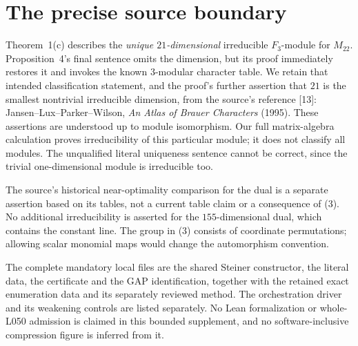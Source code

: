 \documentclass[11pt,a4paper]{article}
\begin{document}
\section{The precise source boundary}
Theorem~1(c) describes the \emph{unique $21$-dimensional} irreducible
$F_3$-module for $M_{22}$. Proposition~4's final sentence omits the dimension,
but its proof immediately restores it and invokes the known $3$-modular
character table. We retain that intended classification statement, and
the proof's further assertion that $21$ is the smallest nontrivial
irreducible dimension, from the source's reference [13]:
Jansen--Lux--Parker--Wilson, \emph{An Atlas of Brauer Characters} (1995).
These assertions are understood up to module isomorphism. Our full
matrix-algebra calculation proves irreducibility of this particular
module; it does not classify all modules. The unqualified literal
uniqueness sentence cannot be correct, since the trivial one-dimensional
module is irreducible too.

The source's historical near-optimality comparison for the dual is a
separate assertion based on its tables, not a current table claim or a
consequence of (3). No additional irreducibility is asserted for the
$155$-dimensional dual, which contains the constant line. The group in
(3) consists of coordinate permutations; allowing scalar monomial maps
would change the automorphism convention.

The complete mandatory local files are the shared Steiner constructor,
the literal data, the certificate and the GAP identification, together
with the retained exact enumeration data and its separately reviewed
method. The orchestration driver and its weakening controls are listed
separately. No Lean formalization or whole-L050 admission is claimed in
this bounded supplement, and no software-inclusive compression figure
is inferred from it.
\end{document}
